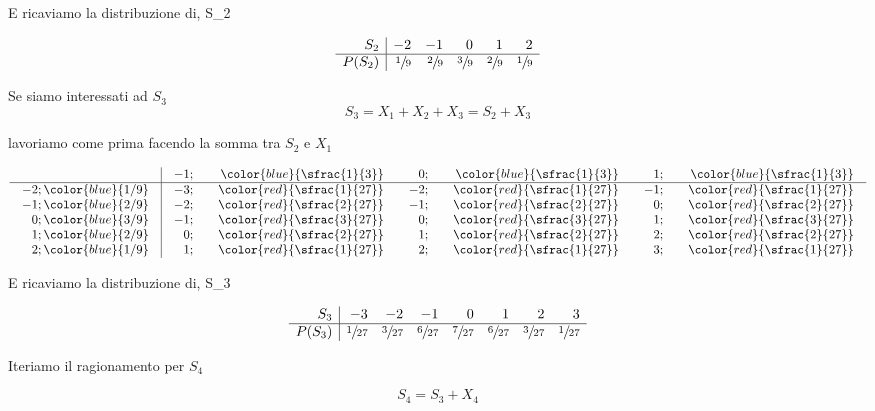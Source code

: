 \documentclass[
  11pt,
]{book}
\theoremstyle{mytheoremstyle}
\theoremstyle{mydefstyle}
\begin{document}
\normalsize E ricaviamo la distribuzione di, S\_2

\normalsize

\[
     \begin{array}{ r|rrrrr }
 S_2  & -2& -1& 0& 1& 2 \\ 
 \hline 
 P( S_2 ) & \sfrac{1}{9}& \sfrac{2}{9}& \sfrac{3}{9}& \sfrac{2}{9}& \sfrac{1}{9} \\ 
 \end{array}
 \]

Se siamo interessati ad \(S_3\)
\[
S_3=X_1+X_2+X_3=S_2+X_3
\]

lavoriamo come prima facendo la somma tra \(S_2\) e \(X_1\)

\normalsize

\[\arraycolsep=10pt\def\arraystretch{1}\begin{array}{ r|rrrrrr }
& -1 ;&\color{blue}{ \sfrac{ 1 } { 3 }} & 0 ;&\color{blue}{ \sfrac{ 1 } { 3 }} & 1 ;&\color{blue}{ \sfrac{ 1 } { 3 }} \\ 
\hline 
-2 ;\color{blue}{ 1 / 9 }& -3;&\color{red}{\sfrac{1}{27}}& -2;&\color{red}{\sfrac{1}{27}}& -1;&\color{red}{\sfrac{1}{27}}\\ 
-1 ;\color{blue}{ 2 / 9 }& -2;&\color{red}{\sfrac{2}{27}}& -1;&\color{red}{\sfrac{2}{27}}& 0;&\color{red}{\sfrac{2}{27}}\\ 
0 ;\color{blue}{ 3 / 9 }& -1;&\color{red}{\sfrac{3}{27}}& 0;&\color{red}{\sfrac{3}{27}}& 1;&\color{red}{\sfrac{3}{27}}\\ 
1 ;\color{blue}{ 2 / 9 }& 0;&\color{red}{\sfrac{2}{27}}& 1;&\color{red}{\sfrac{2}{27}}& 2;&\color{red}{\sfrac{2}{27}}\\ 
2 ;\color{blue}{ 1 / 9 }& 1;&\color{red}{\sfrac{1}{27}}& 2;&\color{red}{\sfrac{1}{27}}& 3;&\color{red}{\sfrac{1}{27}}\\ 
\end{array}
 \]

\normalsize E ricaviamo la distribuzione di, S\_3

\normalsize

\[
     \begin{array}{ r|rrrrrrr }
 S_3  & -3& -2& -1& 0& 1& 2& 3 \\ 
 \hline 
 P( S_3 ) & \sfrac{1}{27}& \sfrac{3}{27}& \sfrac{6}{27}& \sfrac{7}{27}& \sfrac{6}{27}& \sfrac{3}{27}& \sfrac{1}{27} \\ 
 \end{array}
 \]

Iteriamo il ragionamento per \(S_4\)

\[
S_4=S_3+X_4
\]
\end{document}
